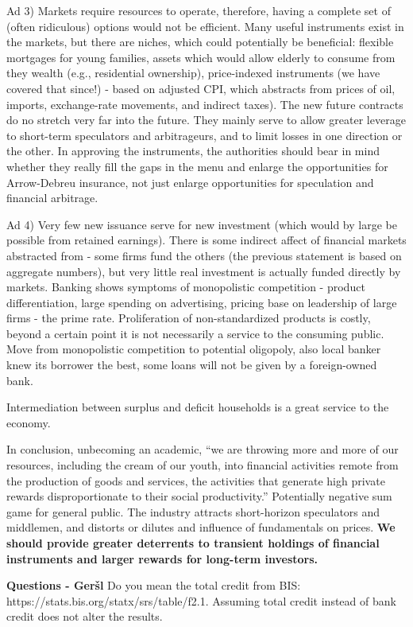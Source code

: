 \documentclass[a4paper,11pt]{article}
\begin{document}
Ad 3) Markets require resources to operate, therefore, having a complete set of (often ridiculous) options would not be efficient. Many useful instruments exist in the markets, but there are niches, which could potentially be beneficial: flexible mortgages for young families, assets which would allow elderly to consume from they wealth (e.g., residential ownership), price-indexed instruments (we have covered that since!) - based on adjusted CPI, which abstracts from prices of oil, imports, exchange-rate  movements, and indirect taxes). The new future contracts do no stretch very far into the future. They mainly serve to allow greater leverage to short-term speculators and arbitrageurs, and to limit losses in one direction or the other. In approving the instruments, the authorities should bear in mind whether they really fill the gaps in the menu and enlarge the opportunities for Arrow-Debreu insurance, not just enlarge opportunities for speculation and financial arbitrage. 

Ad 4) Very few new issuance serve for new investment (which would by large be possible from retained earnings). There is some indirect affect of financial markets abstracted from - some firms fund the others (the previous statement is based on aggregate numbers), but very little real investment is actually funded directly by markets. Banking shows symptoms of monopolistic competition - product differentiation, large spending on advertising, pricing base on leadership of large firms - the prime rate. Proliferation of non-standardized products is costly, beyond a certain point it is not necessarily a service to the consuming public. Move from monopolistic competition to potential oligopoly, also local banker knew its borrower the best, some loans will not be given by a foreign-owned bank.

Intermediation between surplus and deficit households is a great service to the economy. 

In conclusion, unbecoming an academic, ``we are throwing more and more of our resources, including the cream of our youth, into financial activities remote from the production of goods and services, the activities that generate high private rewards disproportionate to their social productivity.'' Potentially negative sum game for general public. The industry attracts short-horizon speculators and middlemen, and distorts or dilutes and influence of fundamentals on prices. \textbf{We should provide greater deterrents to transient holdings of financial instruments and larger rewards for long-term investors.}

\textbf{Questions - Geršl}
Do you mean the total credit from BIS: https://stats.bis.org/statx/srs/table/f2.1. Assuming total credit instead of bank credit does not alter the results.

\printbibliography
\end{document}
